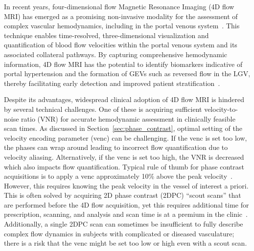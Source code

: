 In recent years, four-dimensional flow Magnetic Resonance Imaging (4D flow MRI) has emerged as a promising non-invasive modality for the assessment of complex vascular hemodynamics, including in the portal venous system~\cite{oechteringClinicalApplications4D2022, motosugiFourdimensionalFlowMRI2019}. This technique enables time-resolved, three-dimensional visualization and quantification of blood flow velocities within the portal venous system and its associated collateral pathways. By capturing comprehensive hemodynamic information, 4D flow MRI has the potential to identify biomarkers indicative of portal hypertension and the formation of GEVs such as reversed flow in the LGV, thereby facilitating early detection and improved patient stratification~\cite{roldan-alzateImpairedRegulationPortal2015, roldan-alzateVivoValidation4D2013}.

Despite its advantages, widespread clinical adoption of 4D flow MRI is hindered by several technical challenges. One of these is acquiring sufficient velocity-to-noise ratio (VNR) for accurate hemodynamic assessment in clinically feasible scan times. As discussed in Section~\ref{sec:phase_contrast}, optimal setting of the velocity encoding parameter (venc) can be challenging. If the venc is set too low, the phases can wrap around leading to incorrect flow quantification due to velocity aliasing. Alternatively, if the venc is set too high, the VNR is decreased which also impacts flow quantification. Typical rule of thumb for phase contrast acquisitions is to apply a venc approximately 10\% above the peak velocity~\cite{dyverfeldt4DFlowCardiovascular2015}. However, this requires knowing the peak velocity in the vessel of interest a priori. This is often solved by acquiring 2D phase contrast (2DPC) “scout scans” that are performed before the 4D flow acquisition, yet this requires additional time for prescription, scanning, and analysis and scan time is at a premium in the clinic~\cite{weiOptimizationPhasecontrastMRI2019}. Additionally, a single 2DPC scan can sometimes be insufficient to fully describe complex flow dynamics in subjects with complicated or diseased vasculature; there is a risk that the venc might be set too low or high even with a scout scan.


